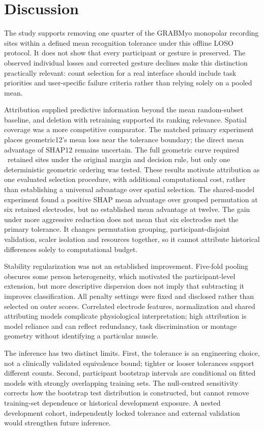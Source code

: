 \section{Discussion}
The study supports removing one quarter of the GRABMyo monopolar recording sites within a defined mean recognition tolerance under this offline LOSO protocol. It does not show that every participant or gesture is preserved. The observed individual losses and corrected gesture declines make this distinction practically relevant: count selection for a real interface should include task priorities and user-specific failure criteria rather than relying solely on a pooled mean.

Attribution supplied predictive information beyond the mean random-subset baseline, and deletion with retraining supported its ranking relevance. Spatial coverage was a more competitive comparator. The matched primary experiment places geometric12's mean loss near the tolerance boundary; the direct mean advantage of SHAP12 remains uncertain. The full geometric curve required \RevGeomKStarCI\ retained sites under the original margin and decision rule, but only one deterministic geometric ordering was tested. These results motivate attribution as one evaluated selection procedure, with additional computational cost, rather than establishing a universal advantage over spatial selection. The shared-model experiment found a positive SHAP mean advantage over grouped permutation at six retained electrodes, but no established mean advantage at twelve. The gain under more aggressive reduction does not mean that six electrodes met the primary tolerance. It changes permutation grouping, participant-disjoint validation, scaler isolation and resources together, so it cannot attribute historical differences solely to computational budget.

Stability regularization was not an established improvement. Five-fold pooling obscures some person heterogeneity, which motivated the participant-level extension, but more descriptive dispersion does not imply that subtracting it improves classification. All penalty settings were fixed and disclosed rather than selected on outer scores. Correlated electrode features, normalization and shared attributing models complicate physiological interpretation; high attribution is model reliance and can reflect redundancy, task discrimination or montage geometry without identifying a particular muscle.

The inference has two distinct limits. First, the tolerance is an engineering choice, not a clinically validated equivalence bound; tighter or looser tolerances support different counts. Second, participant bootstrap intervals are conditional on fitted models with strongly overlapping training sets. The null-centred sensitivity corrects how the bootstrap test distribution is constructed, but cannot remove training-set dependence or historical development exposure. A nested development cohort, independently locked tolerance and external validation would strengthen future inference.


